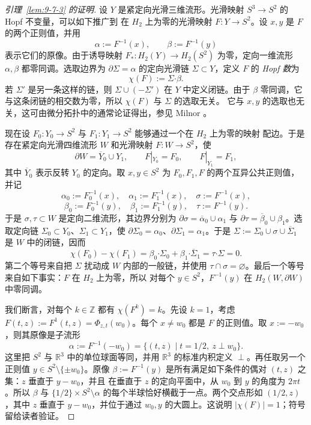 \begin{proof}[引理~\ref{lem:9-7-3} 的证明]
设 $Y$ 是紧定向光滑三维流形。光滑映射 $S^3\to S^2$ 的 Hopf 不变量，可以如下推广到
在 $H_2$ 上为零的光滑映射 $F:Y\to S^2$。设 $x,y$ 是 $F$ 的两个正则值，并用
\[
  \alpha:=F^{-1}(x),\qquad \beta:=F^{-1}(y)
\]
表示它们的原像。由于诱导映射 $F_*:H_2(Y)\to H_2(S^2)$ 为零，定向一维流形
$\alpha,\beta$ 都零同调。选取边界为 $\partial\Sigma=\alpha$ 的定向光滑链
$\Sigma\subset Y$，定义 $F$ 的 \emph{Hopf 数}为
\[
  \chi(F):=\Sigma\mathbin{\boldsymbol\cdot}\beta.
\]
若 $\Sigma'$ 是另一条这样的链，则 $\Sigma\cup(-\Sigma')$ 在 $Y$ 中定义闭链。由于
$\beta$ 零同调，它与这条闭链的相交数为零，所以 $\chi(F)$ 与 $\Sigma$ 的选取无关。
它与 $x,y$ 的选取也无关，这可由微分拓扑中的通常论证得出，参见 Milnor 。

现在设 $F_0:Y_0\to S^2$ 与 $F_1:Y_1\to S^2$ 能够通过一个在 $H_2$ 上为零的映射
配边。于是存在紧定向光滑四维流形 $W$ 和光滑映射 $F:W\to S^2$，使
\[
  \partial W=\overline Y_0\cup Y_1,
  \qquad F|_{Y_0}=F_0,
  \qquad F|_{Y_1}=F_1,
\]
其中 $\overline Y_0$ 表示反转 $Y_0$ 的定向。取 $x,y\in S^2$ 为
$F_0,F_1,F$ 的两个互异公共正则值，并记
\[
  \alpha_0:=F_0^{-1}(x),\quad
  \alpha_1:=F_1^{-1}(x),\quad
  \sigma:=F^{-1}(x),
\]
\[
  \beta_0:=F_0^{-1}(y),\quad
  \beta_1:=F_1^{-1}(y),\quad
  \tau:=F^{-1}(y).
\]
于是 $\sigma,\tau\subset W$ 是定向二维流形，其边界分别为
$\partial\sigma=\overline\alpha_0\cup\alpha_1$ 与
$\partial\tau=\overline\beta_0\cup\beta_1$。选取定向链
$\Sigma_0\subset Y_0$、$\Sigma_1\subset Y_1$，使
$\partial\Sigma_0=\alpha_0$、$\partial\Sigma_1=\alpha_1$。于是
$\Sigma:=\Sigma_0\cup\sigma\cup\overline\Sigma_1$ 是 $W$ 中的闭链，因而
\[
  \chi(F_0)-\chi(F_1)
  =\beta_0\mathbin{\boldsymbol\cdot}\Sigma_0
   +\beta_1\mathbin{\boldsymbol\cdot}\overline\Sigma_1
  =\tau\mathbin{\boldsymbol\cdot}\Sigma=0.
\]
第二个等号来自把 $\Sigma$ 扰动成 $W$ 内部的一般链，并使用
$\tau\cap\sigma=\varnothing$。最后一个等号来自如下事实：$F$ 在 $H_2$ 上为零，所以
对每个 $y\in S^2$，$F^{-1}(y)$ 在 $H_2(W,\partial W)$ 中零同调。

我们断言，对每个 $k\in\mathbb Z$ 都有 $\chi(F^k)=k$。先设 $k=1$，考虑
$F(t,z):=F^1(t,z)=\Phi_{z,t}(w_0)$。每个 $x\ne w_0$ 都是 $F$ 的正则值。取
$x:=-w_0$，则其原像是子流形
\[
  \alpha:=F^{-1}(-w_0)
  =\{(t,z)\mid t=1/2,\ z\perp w_0\}.
\]
这里把 $S^2$ 与 $\mathbb R^3$ 中的单位球面等同，并用 $\mathbb R^3$ 的标准内积定义
$\perp$。再任取另一个正则值 $y\in S^2\setminus\{\pm w_0\}$。原像
$\beta:=F^{-1}(y)$ 是所有满足如下条件的偶对 $(t,z)$ 之集：$z$ 垂直于 $y-w_0$，并且
在垂直于 $z$ 的定向平面中，从 $w_0$ 到 $y$ 的角度为 $2\pi t$。所以 $\beta$ 与
$\{1/2\}\times S^2\setminus\alpha$ 的每个半球恰好横截于一点。两个交点形如
$(1/2,z)$，其中 $z$ 垂直于 $y-w_0$，并位于通过 $w_0,y$ 的大圆上。这说明
$|\chi(F)|=1$；符号留给读者验证。


\end{proof}
